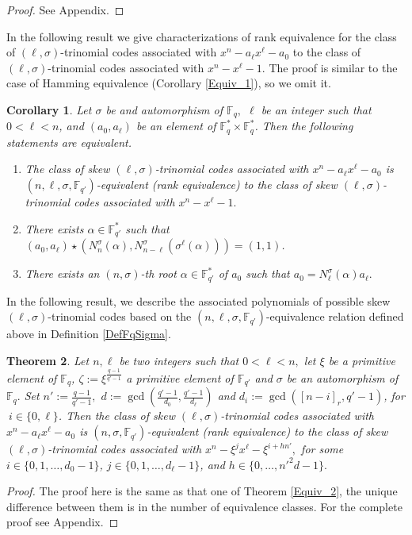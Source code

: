 \documentclass[12pt,paper]{article}
\theoremstyle{plain}
\newtheorem{theorem}{Theorem}[section] %
\newtheorem{corollary}[theorem]{Corollary}
\newcommand{\Fq}{\mathbb{F}_{q}}
\begin{document}
\begin{proof}
     See Appendix.
\end{proof}


In the following result we give characterizations of rank equivalence for the class of  $(\ell,\sigma)$-trinomial codes  associated with  $x^n - a_{\ell}x^{\ell} - a_0$ to the class of $(\ell,\sigma)$-trinomial codes  associated with  $x^n - x^{\ell} - 1.$ The proof is similar to the case of Hamming equivalence (Corollary \ref{Equiv_1}), so we omit it.


\begin{corollary} \label{Caract_(1,1)}
Let $\sigma$ be and automorphism of $ \Fq,$ $\ell$ be an integer such that  $0<\ell<n$,  and  $(a_0, a_{\ell})$ be an element of $\mathbb{F}_q^{*} \times \mathbb{F}_q^{*}$. Then the following statements are equivalent.
    \begin{enumerate}
        \item  The class of skew  $(\ell,\sigma)$-trinomial codes  associated with  $x^n - a_{\ell}x^{\ell} - a_0$ is  $(n,\ell,\sigma, \mathbb{F}_{q'})$-equivalent (rank equivalence) to the class of   skew  $(\ell,\sigma)$-trinomial codes  associated with $x^n - x^{\ell} - 1.$
        \item  There exists $ \alpha \in \mathbb{F}_{q'}^*  $ such that $(a_0, a_{\ell})\star\left(N^{\sigma}_{n}(\alpha), N^{\sigma}_{n-\ell}(\sigma^{\ell}(\alpha)) \right)= (1, 1)$. 
        \item  There exists  an $(n,\sigma)$-th root  $ \alpha \in \mathbb{F}_{q'}^* $  of $a_0$  such that 
        $   a_0 =  N^{\sigma}_{\ell}(\alpha) a_\ell.$ 
        \end{enumerate}
\end{corollary}



 In the following result, we describe the associated polynomials of possible skew $(\ell,\sigma)$-trinomial codes based on the  $( n,\ell,\sigma, \mathbb{F}_{q'})$-equivalence relation defined above in Definition \ref{DefFqSigma}.
\begin{theorem}\label{RankClasses}
Let $n, \ell$ be two integers such that $0<\ell<n,$ let $\xi$ be  a primitive element of $\Fq$, $ \displaystyle{ \zeta:=\xi^{\frac{q-1}{q'-1}}}$  a primitive element of $\mathbb F_{q'}$ and $\sigma$ be an automorphism of $ \Fq.$  Set  $n':=\frac{q-1}{q'-1} ,$
  $  d:=\gcd \left(\frac{q'-1}{ d_0}, \frac{q'-1}{ d_{\ell}}\right)$  and $ d_i:=\gcd([n-i]_r,q'-1)$, for $ \ i\in \{0,\ell\}$. Then   the class of skew  $(\ell,\sigma)$-trinomial  codes associated with $x^n-a_{\ell}x^{\ell}-a_0$ is $(n,\sigma,\mathbb{F}_{q'})$-equivalent (rank equivalence) to the class of skew  $(\ell,\sigma)$-trinomial  codes associated with  $x^n-\xi^{j} x^{\ell}- \xi^{i+hn'},$ for some $i\in\{0,1,\ldots, d_0-1\}$,  $j\in \{0,1,\ldots, d_{\ell}-1\}$, and $ h\in \{0,\ldots, {n'}^2 d-1\}.$
  \end{theorem}
  \begin{proof}
      The proof here is the same as that one of Theorem \ref{Equiv_2}, the unique difference between them is in the number of equivalence classes. For the complete proof  see Appendix.
  \end{proof}
\end{document}

